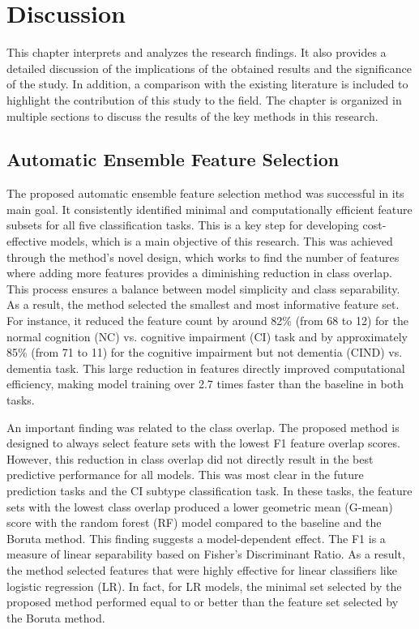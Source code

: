 \chapter{Discussion}

\hspace{12.7mm}This chapter interprets and analyzes the research findings. It also provides a detailed discussion of the implications of the obtained results and the significance of the study. In addition, a comparison with the existing literature is included to highlight the contribution of this study to the field. The chapter is organized in multiple sections to discuss the results of the key methods in this research. 

\section{Automatic Ensemble Feature Selection}
The proposed automatic ensemble feature selection method was successful in its main goal. It consistently identified minimal and computationally efficient feature subsets for all five classification tasks. This is a key step for developing cost-effective models, which is a main objective of this research. This was achieved through the method's novel design, which works to find the number of features where adding more features provides a diminishing reduction in class overlap. This process ensures a balance between model simplicity and class separability. As a result, the method selected the smallest and most informative feature set. For instance, it reduced the feature count by around 82\% (from 68 to 12) for the normal cognition (\acrshort{NC}) vs. cognitive impairment (\acrshort{CI}) task and by approximately 85\% (from 71 to 11) for the cognitive impairment but not dementia (\acrshort{CIND}) vs. dementia task. This large reduction in features directly improved computational efficiency, making model training over 2.7 times faster than the baseline in both tasks. 

An important finding was related to the class overlap. The proposed method is designed to always select feature sets with the lowest F1 feature overlap scores. However, this reduction in class overlap did not directly result in the best predictive performance for all models. This was most clear in the future prediction tasks and the CI subtype classification task. In these tasks, the feature sets with the lowest class overlap produced a lower geometric mean (\acrshort{G-mean}) score with the random forest (\acrshort{RF}) model compared to the baseline and the Boruta method. This finding suggests a model-dependent effect. The F1 is a measure of linear separability based on Fisher's Discriminant Ratio. As a result, the method selected features that were highly effective for linear classifiers like logistic regression (\acrshort{LR}). In fact, for LR models, the minimal set selected by the proposed method performed equal to or better than the feature set selected by the Boruta method. 

